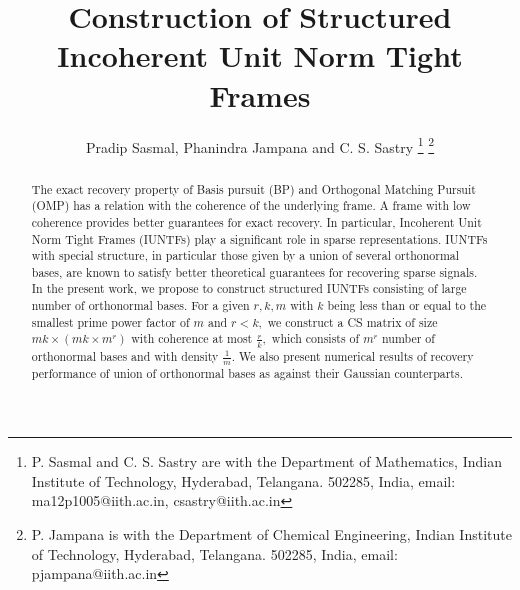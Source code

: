 \documentclass{IEEEtran}
\begin{document}
\title{Construction of Structured Incoherent Unit Norm Tight Frames}
\author{{Pradip Sasmal, Phanindra Jampana and C. S. Sastry}%
\thanks{P. Sasmal and C. S. Sastry are with the Department of Mathematics,
  Indian Institute of Technology, Hyderabad, Telangana. 502285, India, email:
  ma12p1005@iith.ac.in, csastry@iith.ac.in}%
\thanks{P. Jampana is with the Department of Chemical Engineering,
  Indian Institute of Technology, Hyderabad, Telangana. 502285, India, email:
  pjampana@iith.ac.in}}
\maketitle
\begin{abstract} 
  The exact recovery property of Basis pursuit (BP) and Orthogonal Matching
  Pursuit (OMP) has a relation with the coherence of the underlying frame. A
  frame with low coherence provides better
  guarantees for exact recovery. In particular, Incoherent Unit Norm Tight
  Frames (IUNTFs) play a significant
  role in sparse representations. 
  IUNTFs with special structure, in particular those given by a
  union of several orthonormal bases, are known to satisfy better
  theoretical guarantees for recovering sparse signals. In the present work,
  we propose to construct structured IUNTFs consisting of large number of orthonormal bases. For a given $r, k, m$ with $k$
  being less than or equal to the smallest prime power factor of $m$
  and $r<k,$ we construct a CS matrix of size $mk \times (mk\times m^{r})$
  with coherence at most $\frac{r}{k},$ which consists of $m^{r}$ number of
  orthonormal bases and with density $\frac{1}{m}$. 
	We also present numerical results of recovery performance of union of orthonormal bases as against their Gaussian counterparts. 

\end{abstract}
\end{document}
